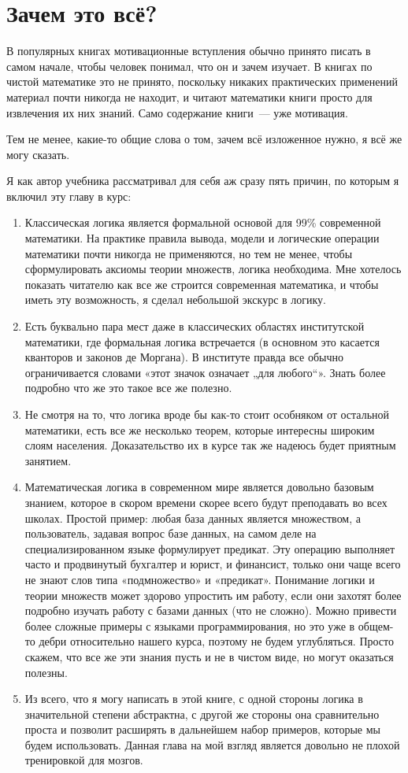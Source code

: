 \section{Зачем это всё?}

В популярных книгах мотивационные вступления обычно принято писать в самом начале, чтобы человек понимал, что он и зачем изучает. В книгах по чистой математике это не принято, поскольку никаких практических применений материал почти никогда не находит, и читают математики книги просто для извлечения их них знаний. Само содержание книги~--- уже мотивация.

Тем не менее, какие-то общие слова о том, зачем всё изложенное нужно, я всё же могу сказать.

Я как автор учебника рассматривал для себя аж сразу пять причин, по которым я включил эту главу в курс:

\begin{enumerate}
\item Классическая логика является формальной основой для 99\% современной математики. На практике правила вывода, модели и логические операции математики почти никогда не применяются, но тем не менее, чтобы сформулировать аксиомы теории множеств, логика необходима. Мне хотелось показать читателю как все же строится современная математика, и чтобы иметь эту возможность, я сделал небольшой экскурс в логику.
\item Есть буквально пара мест даже в классических областях институтской математики, где формальная логика встречается (в основном это касается кванторов и законов де Моргана). В институте правда все обычно ограничивается словами «этот значок означает „для любого“». Знать более подробно что же это такое все же полезно.
\item Не смотря на то, что логика вроде бы как-то стоит особняком от остальной математики, есть все же несколько теорем, которые интересны широким слоям населения. Доказательство их в курсе так же надеюсь будет приятным занятием.
\item Математическая логика в современном мире является довольно базовым знанием, которое в скором времени скорее всего будут преподавать во всех школах. Простой пример: любая база данных является множеством, а пользователь, задавая вопрос базе данных, на самом деле на специализированном языке формулирует предикат. Эту операцию выполняет часто и продвинутый бухгалтер и юрист, и финансист, только они чаще всего не знают слов типа «подмножество» и «предикат». Понимание логики и теории множеств может здорово упростить им работу, если они захотят более подробно изучать работу с базами данных (что не сложно). Можно привести более сложные примеры с языками программирования, но это уже в общем-то дебри относительно нашего курса, поэтому не будем углубляться. Просто скажем, что все же эти знания пусть и не в чистом виде, но могут оказаться полезны.
\item Из всего, что я могу написать в этой книге, с одной стороны логика в значительной степени абстрактна, с другой же стороны она сравнительно проста и позволит расширять в дальнейшем набор примеров, которые мы будем использовать. Данная глава на мой взгляд является довольно не плохой тренировкой для мозгов.
\end{enumerate}

